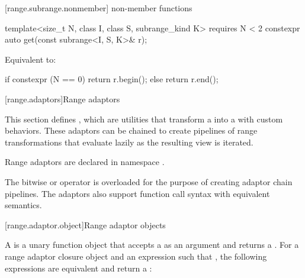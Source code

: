 [range.subrange.nonmember]{ non-member functions}

%
\begin{itemdecl}
template<size_t N, class I, class S, subrange_kind K>
  requires N < 2
constexpr auto get(const subrange<I, S, K>& r);
\end{itemdecl}

\begin{itemdescr}
\pnum
\effects Equivalent to:
\begin{codeblock}
if constexpr (N == 0)
  return r.begin();
else
  return r.end();
\end{codeblock}
\end{itemdescr}

[range.adaptors]{Range adaptors}

\pnum
This section defines , which are utilities that transform a
 into a  with custom behaviors. These
adaptors can be chained to create pipelines of range transformations that
evaluate lazily as the resulting view is iterated.

\pnum
Range adaptors are declared in namespace .

\pnum
The bitwise or operator is overloaded for the purpose of creating adaptor chain
pipelines. The adaptors also support function call syntax with equivalent
semantics.

\pnum
\begin{example}
\end{example}

[range.adaptor.object]{Range adaptor objects}

\pnum
A  is a unary function object that accepts
a  as an argument and returns a . For
a range adaptor closure object  and an expression  such that
   , the following
expressions are equivalent and return a :

